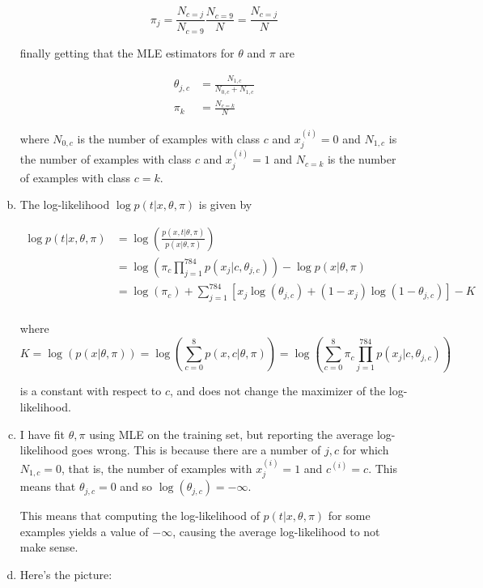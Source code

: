 \documentclass{article}
\begin{document}
\begin{enumerate}[(a)]
    \[\pi_j = \frac{N_{c = j}}{N_{c = 9}} \frac{N_{c = 9}}{N} = \frac{N_{c = j}}{N} \]

    finally getting that the MLE estimators for $\theta$ and $\pi$ are

    \begin{align*}
        \theta_{j, c} &= \frac{N_{1, c}}{N_{0, c} + N_{1, c}} \\
        \pi_k &= \frac{N_{c = k}}{N}
    \end{align*}

    where $N_{0, c}$ is the number of examples with class $c$ and $x_j^{(i)} = 0$ and $N_{1, c}$ is the number of examples with class $c$ and $x_j^{(i)} = 1$ and $N_{c = k}$ is the number of examples with class $c = k$.

    \item The log-likelihood $\log p(t | x, \theta, \pi)$ is given by
    
    \begin{align*}
        \log p(t | x, \theta, \pi) &= \log \left(\frac{p(x, t | \theta, \pi)}{p(x | \theta, \pi)}\right)\\
        &= \log\left(\pi_c \prod_{j = 1}^{784} p(x_j | c, \theta_{j, c})\right) - \log p(x | \theta, \pi)\\
        &= \log\left(\pi_c\right) + \sum_{j = 1}^{784} \left[ x_j \log(\theta_{j, c}) + (1 - x_j) \log(1 - \theta_{j, c})\right] - K\\
    \end{align*}

    where \[K = \log(p(x | \theta, \pi)) = \log\left(\sum_{c = 0}^8 p(x, c | \theta, \pi)\right) = \log\left(\sum_{c = 0}^8 \pi_c \prod_{j = 1}^{784} p(x_j | c, \theta_{j, c})\right)\]

    is a constant with respect to $c$, and does not change the maximizer of the log-likelihood. 

    \item I have fit $\theta, \pi$ using MLE on the training set, but reporting the average log-likelihood goes wrong. This is because there are a number of $j, c$ for which $N_{1, c} = 0$, that is, the number of examples with $x_{j}^{(i)} = 1$ and $c^{(i)} = c$. This means that $\theta_{j, c} = 0$ and so $\log(\theta_{j, c}) = -\infty$.
    
    This means that computing the log-likelihood of $p(t | x, \theta, \pi)$ for some examples yields a value of $-\infty$, causing the average log-likelihood to not make sense. 

    \item Here's the picture: 
    

\end{enumerate}
\end{document}
